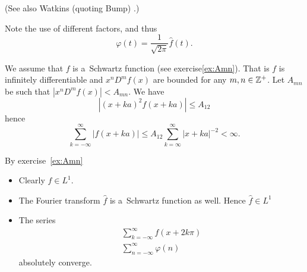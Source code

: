 \begin{enumerate}
(See also Watkins (quoting Bump) \cite{Watkins:fnleqn}.)

Note the use of different factors, and thus
\begin{equation*}
\varphi(t) = \frac{1}{\sqrt{2\pi}} \widehat{f}(t).
\end{equation*}


We assume that $f$ is 
a~Schwartz function (see exercise\ref{ex:Amn}). 
That is $f$ is infinitely differentiable
and \(x^nD^m f(x)\) are bounded for any \(m,n\in\mathbb{Z}^+\).
Let \(A_{mn}\) be such that \(|x^nD^m f(x)| < A_{mn}\).
We have 
\begin{equation*}
\left|(x+ka)^2f(x+ka)\right| \leq A_{12}
\end{equation*}
hence
\begin{equation*}
\sum_{k = -\infty}^\infty |f(x + ka)|
\leq A_{12} \sum_{k = \infty}^\infty|x+ka|^{-2} < \infty.
\end{equation*}

\iffalse
Pick arbitrary \(x\in\R\) and \(a>0\).
We will now show that \(\sum_{k = -\infty}^\infty f(x + ka)\) 
absolutely converges.
Suffices to show that 
\begin{equation}
\sum_{k \geq k_0} |f(x + ka)| < \infty
\end{equation}
for some \(k_0\). We pick \(k_0\) such that \(x+k_0a > 1\).

Clearly the set \(\{k\in\Z: |x+ka|\leq 1\}\) is finite, and so
\begin{equation*}
A := \left|\sum_{\overset{k\in\Z}{|x+ka|\leq 1}} f(x + ka)\right| < \infty.
\end{equation*}

\begin{align*}
\left|\sum_{k = -\infty}^\infty f(x + ka)\right|
&\leq A + \sum_{\overset{k\in\Z}{|x+ka|>1}} |f(x + ka)| \\
&\leq A + \sum_{\overset{k\in\Z}{|x+ka|>1}} |(x+ka)\cdot f(x + ka)| 
\end{align*}
\fi 

By exercise~\ref{ex:Amn}
\begin{itemize}

\item Clearly \(f\in L^1\).

\item 
The Fourier transform \(\widehat{f}\) is a~Schwartz function as well.
Hence \(\widehat{f}\in L^1\)

\item The series
\begin{gather*}
\sum_{k = -\infty}^\infty f(x + 2k\pi) \\
\sum_{n = -\infty}^\infty \varphi(n) 
\end{gather*}
absolutely converge.
\end{itemize}


\end{enumerate}
